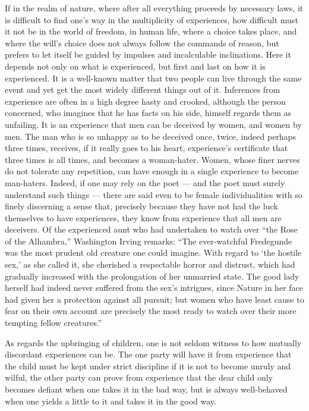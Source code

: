 \documentclass[12pt,a4paper,openany]{book}
\newcommand{\opage}[1]{\marginnote{\footnotesize\textit{[#1]}}}
\begin{document}
If in the realm of nature, where after all everything proceeds by necessary
laws, it is difficult to find one's way in the
multiplicity of experiences, how difficult must it not be
in the world of freedom, in human life, where a choice takes
place, and where the will's choice does not always follow the
commands of reason, but prefers to let itself be guided by impulses
and incalculable inclinations. Here
it depends not only on what is experienced, but
first and last on how it is experienced. It is a well-known
matter that two people can live through the same event
and yet get the most widely different things out of it.
Inferences from experience are often in a high degree hasty and
crooked, although the person concerned, who imagines that he has
\setcounter{footnote}{0}%
\opage{38}facts on his side, himself regards them as unfailing.
It is an experience that men can be deceived by
women, and women by men. The man who is so
unhappy as to be deceived once, twice, indeed
perhaps three times, receives, if it really goes to his
heart, experience's certificate that three times is all
times, and becomes a woman-hater. Women, whose
finer nerves do not tolerate any repetition, can have
enough in a single experience to become man-haters.
Indeed, if one may rely on the poet --- and the poet
must surely understand such things --- there are said even to be
female individualities with so finely discerning a
sense that, precisely because they have not had the luck themselves
to have experiences, they know from experience that all men
are deceivers. Of the experienced aunt who had undertaken
to watch over ``the Rose of the Alhambra,'' Washington Irving
remarks: ``The ever-watchful Fredegunde was
the most prudent old creature one could imagine.
With regard to `the hostile sex,' as she called
it, she cherished a respectable horror and distrust,
which had gradually increased with the prolongation of her unmarried state. The good lady
herself had indeed never suffered from the sex's intrigues, since Nature in
her face had given her a protection against
all pursuit; but women who have least
cause to fear on their own account are
precisely the most ready to watch over their more
tempting fellow creatures.''

As regards the upbringing of children, one is not
seldom witness to how mutually discordant experiences can
be. The one party will have it from experience that the child
must be kept under strict discipline if it is not to become unruly
\setcounter{footnote}{0}%
\opage{39}and wilful, the other party can prove from experience
that the dear child only becomes defiant when one takes
it in the bad way, but is always well-behaved when one yields
a little to it and takes it in the good way.
\end{document}
